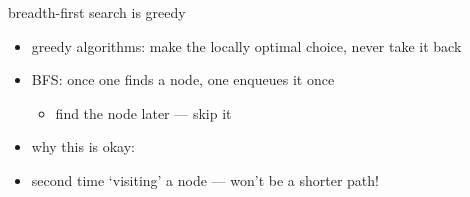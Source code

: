 \begin{frame}{breadth-first search is greedy}
\begin{itemize}
\item greedy algorithms: make the locally optimal choice, never take it back
\item BFS: once one finds a node, one enqueues it once
\begin{itemize}
\item find the node later --- skip it
\end{itemize}
\vspace{.5cm}
\item why this is okay: 
\item second time `visiting' a node --- won't be a shorter path!
\end{itemize}
\end{frame}

